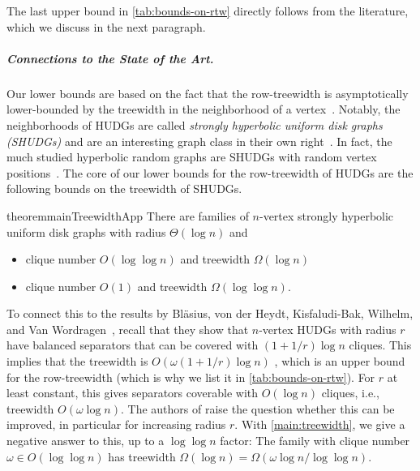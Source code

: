 \documentclass[a4paper,english,cleveref,thm-restate]{lipics-v2021}
\begin{document}
The last upper bound in \cref{tab:bounds-on-rtw} directly follows from the literature, which we discuss in the next paragraph.

\subparagraph{Connections to the State of the Art.}

Our lower bounds are based on the fact that the row-treewidth is asymptotically lower-bounded by the treewidth in the neighborhood of a vertex~\cite{dujmovic_layered_2017}.
Notably, the neighborhoods of HUDGs are called \emph{strongly hyperbolic uniform disk graphs (SHUDGs)} and are an interesting graph class in their own right~\cite{blasius_strongly_2023}.
In fact, the much studied hyperbolic random graphs are SHUDGs with random vertex positions~\cite{krioukov_hyperbolic_2010}.
The core of our lower bounds for the row-treewidth of HUDGs are the following bounds on the treewidth of SHUDGs.
%
\begin{restatable}{theorem}{mainTreewidthApp}\label{main:treewidth}
    There are families of $ n $-vertex strongly hyperbolic uniform disk graphs with radius $\Theta(\log n)$ and
    \begin{itemize}
        \item clique number $ O(\log \log n) $ and treewidth $ \Omega(\log n) $
        \item clique number $ O(1) $ and treewidth $ \Omega(\log \log n) $.
    \end{itemize}
    
\end{restatable}
%
To connect this to the results by Bläsius, von der Heydt, Kisfaludi-Bak, Wilhelm, and Van Wordragen~\cite{Struc_Indep_Hyper_Unifor_Disk_Graph-Blaesius25}, recall that they show that $ n $-vertex HUDGs with radius $ r $ have balanced separators that can be covered with $ (1 + 1/r) \log n $ cliques.
This implies that the treewidth is $ O(\omega (1 + 1/r) \log n) $ \cite{Treew_Graph_Balan_Separ-DvoraNorin19}, which is an upper bound for the row-treewidth (which is why we list it in \cref{tab:bounds-on-rtw}).
For $r$ at least constant, this gives separators coverable with $O(\log n)$ cliques, i.e., treewidth $ O(\omega \log n) $. 
The authors of \cite{Struc_Indep_Hyper_Unifor_Disk_Graph-Blaesius25} raise the question whether this can be improved, in particular for increasing radius $r$.
With \cref{main:treewidth}, we give a negative answer to this, up to a $\log\log n$ factor: The family with clique number $\omega \in O(\log\log n)$ has treewidth $\Omega(\log n) = \Omega(\omega \log n / \log\log n)$.
\end{document}
